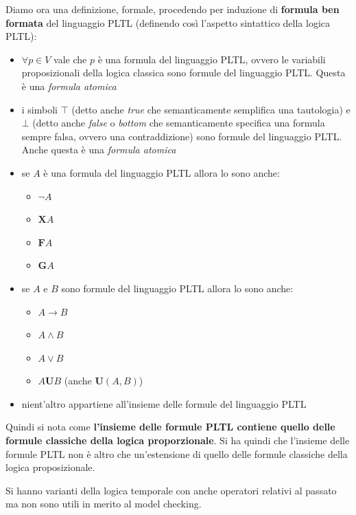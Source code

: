 \begin{definizione}
  Diamo ora una definizione, formale, procedendo per induzione di
  \textbf{formula ben formata} del linguaggio PLTL (definendo così l'aspetto
  sintattico della logica PLTL): 
  \begin{itemize}
    \item $\forall p\in V$ vale che $p$ è una formula del linguaggio PLTL,
    ovvero le variabili proposizionali della logica classica sono formule del
    linguaggio PLTL. Questa è una \emph{formula atomica}
    \item i simboli $\top$ (detto anche \emph{true} che semanticamente
    semplifica
    una tautologia) e $\bot$ (detto anche \textit{false} o \emph{bottom} che
    semanticamente specifica una formula sempre falsa, ovvero una
    contraddizione) sono formule del linguaggio PLTL. Anche questa è una
    \emph{formula atomica}
    \item se $A$ è una formula del linguaggio PLTL allora lo sono anche:
    \begin{itemize}[label=$\ast$]
      \item $\neg A$
      \item $\mathbf{X}A$
      \item $\mathbf{F}A$
      \item $\mathbf{G}A$
    \end{itemize}
   
    \item  se $A$ e $B$ sono formule del linguaggio PLTL allora lo sono anche:
    \begin{itemize}[label=$\ast$]
      \item $A\to B$
      \item $A\land B$
      \item $A\lor B$
      \item $A\mathbf{U}B$ (anche $\mathbf{U}(A, B)$)
    \end{itemize}
    \item nient'altro appartiene all'insieme delle formule del linguaggio PLTL
  \end{itemize}
  Quindi si nota come \textbf{l'insieme delle formule PLTL contiene quello delle
    formule classiche della logica proporzionale}. Si ha quindi che l'insieme
  delle formule PLTL non è altro che un'estensione di quello delle formule
  classiche della logica proposizionale.
\end{definizione}
Si hanno varianti della logica temporale con anche operatori relativi al passato
ma non sono utili in merito al model checking.
